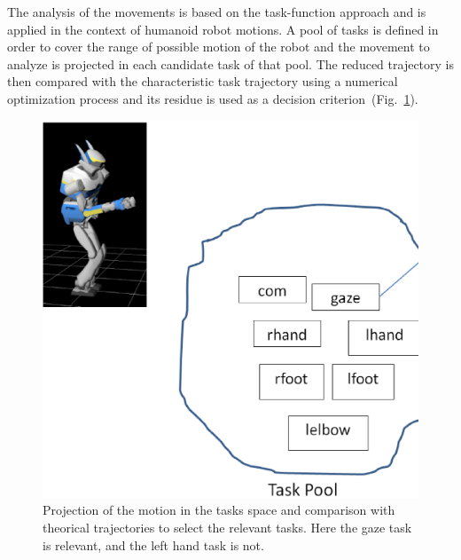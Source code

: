 \documentclass[letterpaper, 10pt, conference]{ieeeconf}      %
\begin{document}
The analysis of the movements is based on the task-function approach and is
applied in the context of humanoid robot motions.  A pool of tasks is defined
in order to cover the range of possible motion of the robot and the
movement to analyze is projected in each candidate task of that pool. 
The reduced trajectory is then compared with the characteristic task trajectory
using a numerical optimization process and its residue is used as a 
decision criterion~(Fig.~\ref{fig:projection}).
\begin{figure}[t]
\begin{center}
\includegraphics[width=0.9\linewidth]{img/projection.ps}
\end{center}
\caption{Projection of the motion in the tasks space and comparison with
theorical trajectories to select the relevant tasks. Here the gaze task is relevant,
and the left hand task is not.}
\label{fig:projection}
\end{figure}
\end{document}
